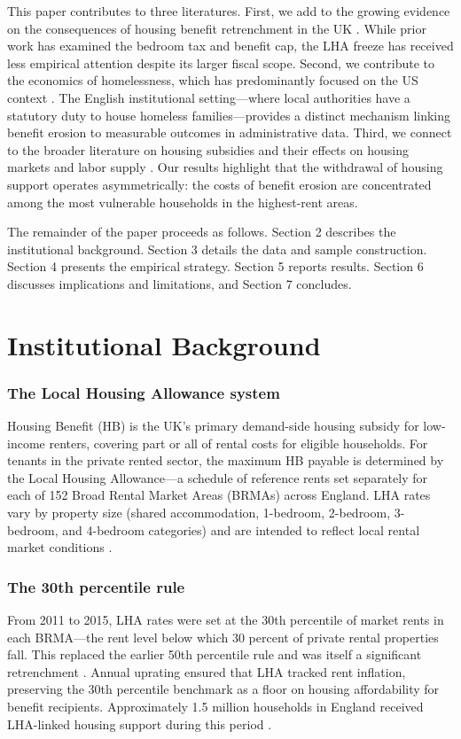 \documentclass[12pt]{article}
\begin{document}
This paper contributes to three literatures. First, we add to the growing evidence on the consequences of housing benefit retrenchment in the UK \citep{gibbons2021, beatty2014, crisp2018}. While prior work has examined the bedroom tax and benefit cap, the LHA freeze has received less empirical attention despite its larger fiscal scope. Second, we contribute to the economics of homelessness, which has predominantly focused on the US context \citep{oflaherty1996, collinson2016, desmond2016}. The English institutional setting---where local authorities have a statutory duty to house homeless families---provides a distinct mechanism linking benefit erosion to measurable outcomes in administrative data. Third, we connect to the broader literature on housing subsidies and their effects on housing markets and labor supply \citep{jacob2012, eriksen2015, fack2006, susin2002}. Our results highlight that the withdrawal of housing support operates asymmetrically: the costs of benefit erosion are concentrated among the most vulnerable households in the highest-rent areas.

The remainder of the paper proceeds as follows. Section 2 describes the institutional background. Section 3 details the data and sample construction. Section 4 presents the empirical strategy. Section 5 reports results. Section 6 discusses implications and limitations, and Section 7 concludes.


\section{Institutional Background}

\subsubsection*{The Local Housing Allowance system} Housing Benefit (HB) is the UK's primary demand-side housing subsidy for low-income renters, covering part or all of rental costs for eligible households. For tenants in the private rented sector, the maximum HB payable is determined by the Local Housing Allowance---a schedule of reference rents set separately for each of 152 Broad Rental Market Areas (BRMAs) across England. LHA rates vary by property size (shared accommodation, 1-bedroom, 2-bedroom, 3-bedroom, and 4-bedroom categories) and are intended to reflect local rental market conditions \citep{stephens2010}.

\subsubsection*{The 30th percentile rule} From 2011 to 2015, LHA rates were set at the 30th percentile of market rents in each BRMA---the rent level below which 30 percent of private rental properties fall. This replaced the earlier 50th percentile rule and was itself a significant retrenchment \citep{brewer2019b}. Annual uprating ensured that LHA tracked rent inflation, preserving the 30th percentile benchmark as a floor on housing affordability for benefit recipients. Approximately 1.5 million households in England received LHA-linked housing support during this period \citep{dfe2018}.
\end{document}
